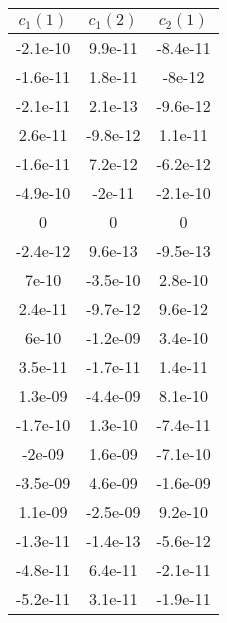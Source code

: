 \begin{tiny}\begin{tabular}{|c|c|c|}
\hline
\textbf{$c_1(1)$}&\textbf{$c_1(2)$}&\textbf{$c_2(1)$}\\\hline
-2.1e-10&9.9e-11&-8.4e-11\\\hline
-1.6e-11&1.8e-11&-8e-12\\\hline
-2.1e-11&2.1e-13&-9.6e-12\\\hline
2.6e-11&-9.8e-12&1.1e-11\\\hline
-1.6e-11&7.2e-12&-6.2e-12\\\hline
-4.9e-10&-2e-11&-2.1e-10\\\hline
0&0&0\\\hline
-2.4e-12&9.6e-13&-9.5e-13\\\hline
7e-10&-3.5e-10&2.8e-10\\\hline
2.4e-11&-9.7e-12&9.6e-12\\\hline
6e-10&-1.2e-09&3.4e-10\\\hline
3.5e-11&-1.7e-11&1.4e-11\\\hline
1.3e-09&-4.4e-09&8.1e-10\\\hline
-1.7e-10&1.3e-10&-7.4e-11\\\hline
-2e-09&1.6e-09&-7.1e-10\\\hline
-3.5e-09&4.6e-09&-1.6e-09\\\hline
1.1e-09&-2.5e-09&9.2e-10\\\hline
-1.3e-11&-1.4e-13&-5.6e-12\\\hline
-4.8e-11&6.4e-11&-2.1e-11\\\hline
-5.2e-11&3.1e-11&-1.9e-11\\\hline
\end{tabular}
\end{tiny}